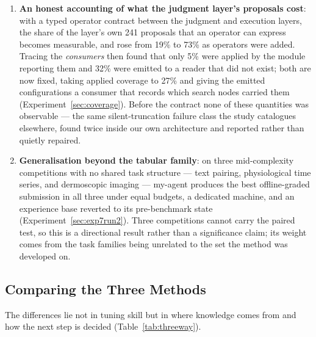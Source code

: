 \documentclass[11pt,a4paper]{article}
\begin{document}
\begin{enumerate}[leftmargin=*]
  \item \textbf{An honest accounting of what the judgment layer's proposals cost}: with a typed operator contract between the judgment and execution layers, the share of the layer's own 241 proposals that an operator can express becomes measurable, and rose from 19\% to 73\% as operators were added. Tracing the \emph{consumers} then found that only 5\% were applied by the module reporting them and 32\% were emitted to a reader that did not exist; both are now fixed, taking applied coverage to 27\% and giving the emitted configurations a consumer that records which search nodes carried them (Experiment~\ref{sec:coverage}). Before the contract none of these quantities was observable --- the same silent-truncation failure class the study catalogues elsewhere, found twice inside our own architecture and reported rather than quietly repaired.
  \item \textbf{Generalisation beyond the tabular family}: on three mid-complexity competitions with no shared task structure --- text pairing, physiological time series, and dermoscopic imaging --- my-agent produces the best offline-graded submission in all three under equal budgets, a dedicated machine, and an experience base reverted to its pre-benchmark state (Experiment~\ref{sec:exp7run2}). Three competitions cannot carry the paired test, so this is a directional result rather than a significance claim; its weight comes from the task families being unrelated to the set the method was developed on.
\end{enumerate}

\subsection{Comparing the Three Methods}

The differences lie not in tuning skill but in where knowledge comes from and how the next step is decided (Table~\ref{tab:threeway}).
\end{document}
